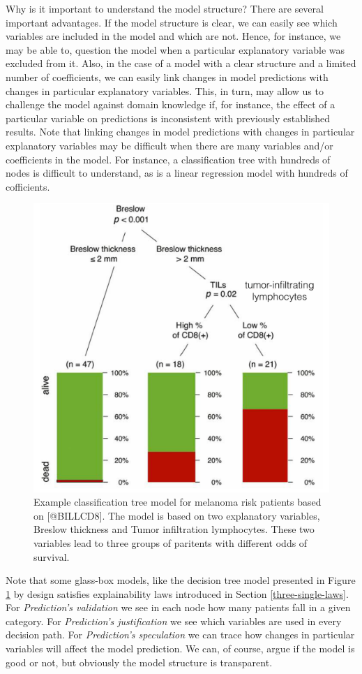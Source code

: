 \documentclass[12pt,]{krantz}
\begin{document}
Why is it important to understand the model structure? There are several important advantages. If the model structure is clear, we can easily see which variables are included in the model and which are not. Hence, for instance, we may be able to, question the model when a particular explanatory variable was excluded from it. Also, in the case of a model with a clear structure and a limited number of coefficients, we can easily link changes in model predictions with changes in particular explanatory variables. This, in turn, may allow us to challenge the model against domain knowledge if, for instance, the effect of a particular variable on predictions is inconsistent with previously established results. Note that linking changes in model predictions with changes in particular explanatory variables may be difficult when there are many variables and/or coefficients in the model. For instance, a classification tree with hundreds of nodes is difficult to understand, as is a linear regression model with hundreds of cofficients.

\begin{figure}

{\centering \includegraphics[width=0.5\linewidth]{figure/wbBILL8model} 

}

\caption{Example classification tree model for melanoma risk patients based on [@BILLCD8]. The model is based on two explanatory variables, Breslow thickness and Tumor infiltration lymphocytes. These two variables lead to three groups of paritents with different odds of survival.}\label{fig:BILLCD8}
\end{figure}

Note that some glass-box models, like the decision tree model presented in Figure \ref{fig:BILLCD8} by design satisfies explainability laws introduced in Section \ref{three-single-laws}.
For \emph{Prediction's validation} we see in each node how many patients fall in a given category. For \emph{Prediction's justification} we see which variables are used in every decision path. For \emph{Prediction's speculation} we can trace how changes in particular variables will affect the model prediction. We can, of course, argue if the model is good or not, but obviously the model structure is transparent.
\end{document}

